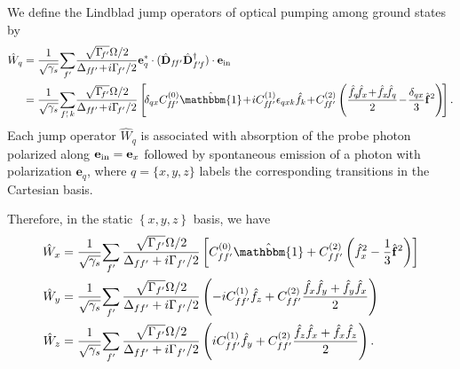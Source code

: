 \documentclass[preprint,aps,pra,onecolumn,superscriptaddress]{revtex4-1} %
\def\bra#1{\langle{#1}\rvert}%
\def\ket#1{\lvert{#1}\rangle}%
\def\Braket#1#2{\mathinner{\langle{#1}\! \mid\! {#2} \rangle}}
\begin{document}
\begin{appendix}
We define the Lindblad jump operators of optical pumping among ground states by~\cite{Deutsch2010a}
	\begin{align}\label{Eq::Wq_Faraday}
		\hat{W}_q &= \frac{1}{\sqrt{\gamma_s}}\!\sum_{f'}\!\frac{\sqrt{\Gamma\!_{f'}}\Omega/2}{\Delta_{f\!f'} \!+\! i\Gamma\!_{f'}/2}\mathbf{e}_q^*\cdot(\hat{\mathbf{D}}_{f\!f'}  \hat{\mathbf{D}}^\dagger_{f'\!f} )\cdot\mathbf{e}_{\rm in} \\
		&= \frac{1}{\sqrt{\gamma_s}}\!\sum_{f'\!\!,\,k}\! \frac{\sqrt{\Gamma\!_{f'}}\Omega/2}{\Delta_{f\!f'}\!+\!i\Gamma\!_{f'}/2} \left[\!\delta_{qx}C_{f\!f'}^{(0)}\hat{\mathbbm{1}} \!+\! iC_{f\!f'}^{(1)}\epsilon_{qxk}\hat{f}_k \!+\! C_{f\!f'}^{(2)}\left(\frac{\hat{f}_q\!\hat{f}_{x}\!+\!\hat{f}_{x}\!\hat{f}_q }{2} \!-\! \frac{\delta_{qx}}{3}\hat{\mathbf{f}}^2 \right)\! \right].
	\end{align}
Each jump operator $\hat{W}_q$ is associated with absorption of the probe photon polarized along $ \mathbf{e}_{\rm in}=\mathbf{e}_x $ followed by spontaneous emission of a photon with polarization $ \mathbf{e}_q $, where $q= \{x,y,z\}$ labels the corresponding transitions in the Cartesian basis. 

Therefore, in the static $ \left\{x,y,z \right\} $ basis, we have
\begin{align}
\hat{W}_{x} &= \frac{1}{\sqrt{\gamma_s}}\!\sum_{f'} \frac{\sqrt{\Gamma_{f'}}\Omega/2}{\Delta_{ff'}+i\Gamma_{f'}/2} \left[C_{ff'}^{(0)}\hat{\mathbbm{1}} + C_{ff'}^{(2)}\left(\hat{f}_{x}^2-\frac{1}{3}\hat{\mathbf{f}}^2 \right) \right]\\
\hat{W}_{y} &= \frac{1}{\sqrt{\gamma_s}}\!\sum_{f'} \frac{\sqrt{\Gamma_{f'}}\Omega/2}{\Delta_{ff'}+i\Gamma_{f'}/2} \left(-iC_{ff'}^{(1)}\hat{f}_z + C_{ff'}^{(2)}\frac{\hat{f}_{x}\hat{f}_{y}+\hat{f}_{y}\hat{f}_{x}}{2} \right)\\
\hat{W}_{z} &= \frac{1}{\sqrt{\gamma_s}}\!\sum_{f'} \frac{\sqrt{\Gamma_{f'}}\Omega/2}{\Delta_{ff'}+i\Gamma_{f'}/2} \left(iC_{ff'}^{(1)}\hat{f}_{y} + C_{ff'}^{(2)}\frac{\hat{f}_z\hat{f}_{x}+\hat{f}_{x}\hat{f}_z}{2}  \right).
\end{align}


\end{appendix}
\end{document}
